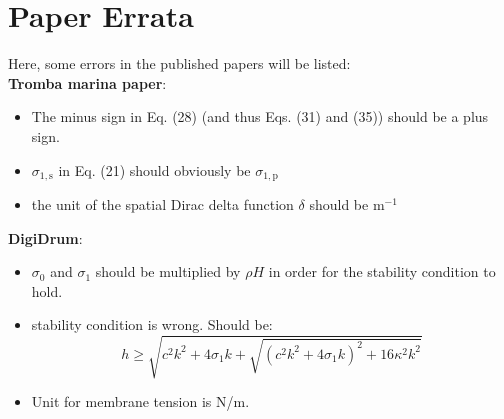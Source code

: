 \chapter{Paper Errata}
Here, some errors in the published papers will be listed:
\\
\textbf{Tromba marina paper}: 
\begin{itemize}
    \item The minus sign in Eq. (28) (and thus Eqs. (31) and (35)) should be a plus sign.
    \item $\sigma_{1,\text{s}}$ in Eq. (21) should obviously be $\sigma_{1,\text{p}}$
    \item the unit of the spatial Dirac delta function $\delta$ should be m$^{-1}$
\end{itemize}
\textbf{DigiDrum}: 
\begin{itemize}
    \item $\sigma_0$ and $\sigma_1$ should be multiplied by $\rho H$ in order for the stability condition to hold.
    \item stability condition is wrong. Should be: 
    \begin{equation}
        h \geq \sqrt{c^2k^2 + 4\sigma_1k + \sqrt{(c^2k^2+4\sigma_1k)^2 + 16\kappa^2k^2}}
    \end{equation}
    \item Unit for membrane tension is N/m.
\end{itemize}